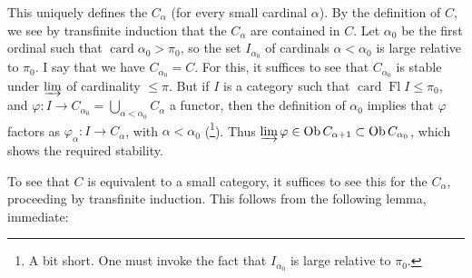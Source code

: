This uniquely defines the $C_\alpha$ (for every small cardinal $\alpha$). By the definition of $C$, we see by transfinite induction that the $C_\alpha$ are contained in $C$. Let $\alpha_0$
be the first ordinal such that $\operatorname{card}\alpha_0>\pi_0$, so the set $I_{\alpha_0}$ of cardinals $\alpha<\alpha_0$ is large relative to $\pi_0$. I say that we have $C_{\alpha_0}=C$. For this, it suffices to see that $C_{\alpha_0}$ is stable under $\varinjlim$ of cardinality $\leqslant\pi$. But if $I$ is a category such that $\operatorname{card}\operatorname{Fl}I\leqslant\pi_0$, and $\varphi : I\longrightarrow C_{\alpha_0}=\bigcup_{\alpha<\alpha_0}C_\alpha$ a functor, then the definition of $\alpha_0$ implies that $\varphi$ factors as $\varphi_\alpha : I\longrightarrow C_\alpha$, with $\alpha<\alpha_0$ (\footnote[55]{A bit short. One must invoke the fact that $I_{\alpha_0}$ is large relative to $\pi_0$.}). Thus $\varinjlim\varphi\in\operatorname{Ob}C_{\alpha+1}\subset\operatorname{Ob}C_{\alpha_0}$, which shows the required stability. %

To see that $C$ is equivalent to a small category, it suffices to see this for the $C_\alpha$, proceeding by transfinite induction. This follows from the following lemma, immediate:

